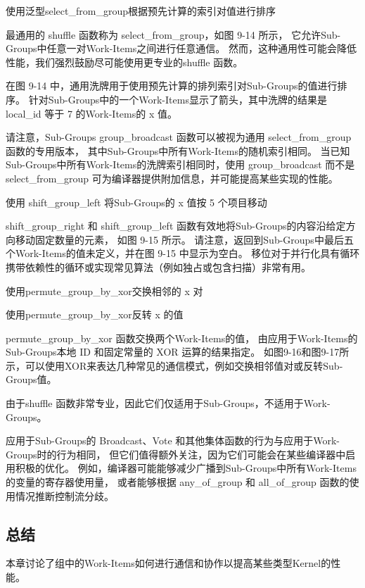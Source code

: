 {\color{red} 使用泛型select\_from\_group根据预先计算的索引对值进行排序}

最通用的 shuffle 函数称为 select\_from\_group，如图 9-14 所示，
它允许Sub-Groups中任意一对Work-Items之间进行任意通信。 
然而，这种通用性可能会降低性能，我们强烈鼓励尽可能使用更专业的shuffle 函数。

在图 9-14 中，通用洗牌用于使用预先计算的排列索引对Sub-Groups的值进行排序。 
针对Sub-Groups中的一个Work-Items显示了箭头，其中洗牌的结果是 local\_id 等于 7 的Work-Items的 x 值。

请注意，Sub-Groups group\_broadcast 函数可以被视为通用 select\_from\_group 函数的专用版本，
其中Sub-Groups中所有Work-Items的随机索引相同。 
当已知Sub-Groups中所有Work-Items的洗牌索引相同时，使用 group\_broadcast 
而不是 select\_from\_group 可为编译器提供附加信息，并可能提高某些实现的性能。

{\color{red} 使用 shift\_group\_left 将Sub-Groups的 x 值按 5 个项目移动}

shift\_group\_right 和 shift\_group\_left 函数有效地将Sub-Groups的内容沿给定方向移动固定数量的元素，
如图 9-15 所示。 请注意，返回到Sub-Groups中最后五个Work-Items的值未定义，并在图 9-15 中显示为空白。 
移位对于并行化具有循环携带依赖性的循环或实现常见算法（例如独占或包含扫描）非常有用。

{\color{red} 使用permute\_group\_by\_xor交换相邻的 x 对}

{\color{red} 使用permute\_group\_by\_xor反转 x 的值}

permute\_group\_by\_xor 函数交换两个Work-Items的值，
由应用于Work-Items的Sub-Groups本地 ID 和固定常量的 XOR 运算的结果指定。 
如图9-16和图9-17所示，可以使用XOR来表达几种常见的通信模式，例如交换相邻值对或反转Sub-Groups值。

由于shuffle 函数非常专业，因此它们仅适用于Sub-Groups，不适用于Work-Groups。

\begin{remark}
应用于Sub-Groups的 Broadcast、Vote 和其他集体函数的行为与应用于Work-Groups时的行为相同，
但它们值得额外关注，因为它们可能会在某些编译器中启用积极的优化。
例如，编译器可能能够减少广播到Sub-Groups中所有Work-Items的变量的寄存器使用量，
或者能够根据 any\_of\_group 和 all\_of\_group 函数的使用情况推断控制流分歧。
\end{remark}

\subsection{总结}
本章讨论了组中的Work-Items如何进行通信和协作以提高某些类型Kernel的性能。

